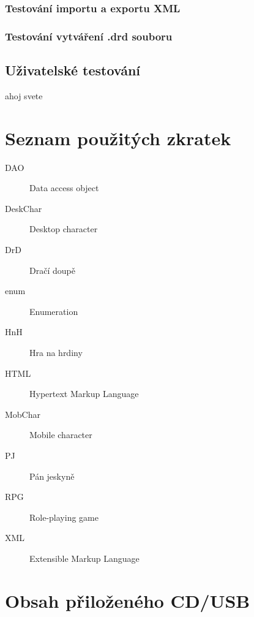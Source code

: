 \documentclass[thesis=B,czech]{resources/FITthesis}[2012/06/26]
\begin{document}
		\subsection{Testování importu a exportu XML}
		\subsection{Testování vytváření .drd souboru}

\section{Uživatelské testování}
ahoj svete

\begin{conclusion}
\end{conclusion}




\appendix

\chapter{Seznam použitých zkratek}
\begin{description}
	\item[DAO] Data access object
	\item[DeskChar] Desktop character
	\item[DrD] Dračí doupě
	\item[enum] Enumeration
	\item[HnH] Hra na hrdiny
	\item[HTML] Hypertext Markup Language
	\item[MobChar] Mobile character
	\item[PJ] Pán jeskyně
	\item[RPG] Role-playing game
	\item[XML] Extensible Markup Language
\end{description}

 

\chapter{Obsah přiloženého CD/USB}


\begin{figure}
\end{figure}
\end{document}
